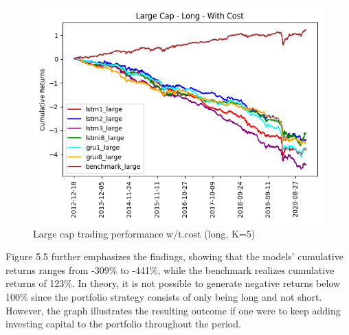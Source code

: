 \begin{figure}[H]
\centering
\includegraphics [scale=0.60,angle=360]{figures/cumulative_large_cap_return_with_cost.png}
\caption{Large cap trading performance w/t.cost (long, K=5)}
\label{fig:largecost}
\end{figure}
\indent\newline 
Figure 5.5 further emphasizes the findings, showing that the models' cumulative returns ranges from -309\% to -441\%, while the benchmark realizes cumulative returns of 123\%. In theory, it is not possible to generate negative returns below 100\% since the portfolio strategy consists of only being long and not short. However, the graph illustrates the resulting outcome if one were to keep adding investing capital to the portfolio throughout the period.    


